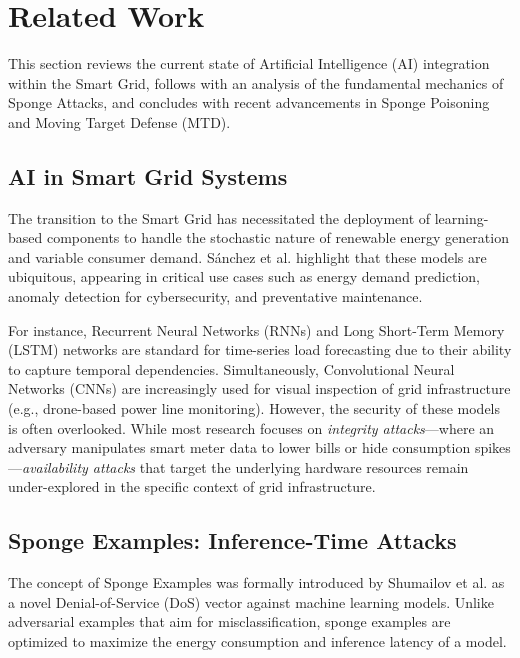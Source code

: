 \documentclass[conference]{IEEEtran}
\begin{document}
\section{Related Work}
\label{sec:related}

This section reviews the current state of Artificial Intelligence (AI) integration within the Smart Grid, follows with an analysis of the fundamental mechanics of Sponge Attacks, and concludes with recent advancements in Sponge Poisoning and Moving Target Defense (MTD).

\subsection{AI in Smart Grid Systems}
The transition to the Smart Grid has necessitated the deployment of learning-based components to handle the stochastic nature of renewable energy generation and variable consumer demand. S{\'a}nchez et al. \cite{sanchez2024attacking} highlight that these models are ubiquitous, appearing in critical use cases such as energy demand prediction, anomaly detection for cybersecurity, and preventative maintenance. 

For instance, Recurrent Neural Networks (RNNs) and Long Short-Term Memory (LSTM) networks are standard for time-series load forecasting due to their ability to capture temporal dependencies. Simultaneously, Convolutional Neural Networks (CNNs) \cite{sanchez2024attacking, shapira2023phantom} are increasingly used for visual inspection of grid infrastructure (e.g., drone-based power line monitoring). However, the security of these models is often overlooked. While most research focuses on \textit{integrity attacks}—where an adversary manipulates smart meter data to lower bills or hide consumption spikes—\textit{availability attacks} that target the underlying hardware resources remain under-explored in the specific context of grid infrastructure.

\subsection{Sponge Examples: Inference-Time Attacks}
The concept of Sponge Examples was formally introduced by Shumailov et al. \cite{shumailov2021sponge} as a novel Denial-of-Service (DoS) vector against machine learning models. Unlike adversarial examples that aim for misclassification, sponge examples are optimized to maximize the energy consumption and inference latency of a model.
\end{document}
